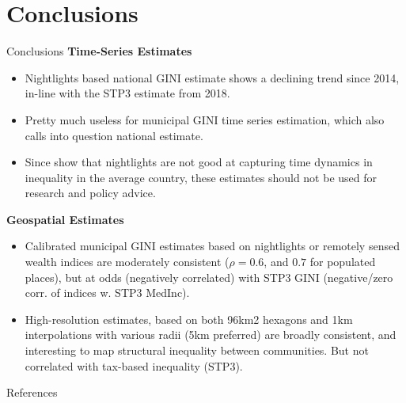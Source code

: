 \documentclass[compress,xcolor=dvipsnames]{beamer}
\newenvironment{noheadline}{
    \setbeamertemplate{headline}{}
    \addtobeamertemplate{frametitle}{\vspace*{-0.9\baselineskip}}{}
}{}
\begin{document}
\section{Conclusions}

\begin{noheadline}
\begin{frame}{Conclusions}
\small
\textbf{Time-Series Estimates}
\begin{itemize} \setlength{\itemsep}{0.5em}
\item Nightlights based national GINI estimate shows a declining trend since 2014, in-line with the STP3 estimate from 2018. 
\item Pretty much useless for municipal GINI time series estimation, which also calls into question national estimate. 
\item Since \citet{galimberti2021measuring} show that nightlights are not good at capturing time dynamics in inequality in the average country, these estimates should not be used for research and policy advice. 
\end{itemize}

\textbf{Geospatial Estimates}
\begin{itemize} \setlength{\itemsep}{0.5em}
\item Calibrated municipal GINI estimates based on nightlights or remotely sensed wealth indices are moderately consistent ($\rho = 0.6$, and $0.7$ for populated places), but at odds (negatively correlated) with STP3 GINI (negative/zero corr. of indices w. STP3 MedInc). 
\item High-resolution estimates, based on both 96km2 hexagons and 1km interpolations with various radii (5km preferred) are broadly consistent, and interesting to map structural inequality between communities. But not correlated with tax-based inequality (STP3). 
\end{itemize}
\end{frame}

\begin{frame}{References} %

\end{frame}
\end{noheadline}
\end{document}
